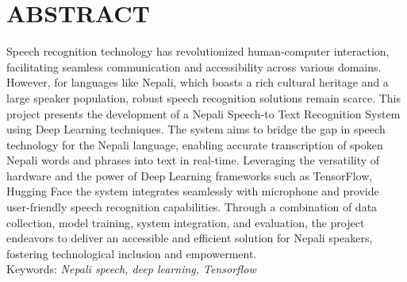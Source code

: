 \cleardoublepage
{}
\chapter*{ABSTRACT}
Speech recognition technology has revolutionized human-computer interaction, facilitating seamless communication and accessibility across various domains. However, for languages like Nepali, which boasts a rich cultural heritage and a large speaker population, robust speech recognition solutions remain scarce. This project presents the development of a Nepali Speech-to
Text Recognition System using Deep Learning techniques. The system aims to bridge the gap in speech technology for the Nepali language, enabling accurate transcription of spoken Nepali words and phrases into text in real-time. Leveraging the versatility of hardware and the power of Deep Learning frameworks such as TensorFlow, Hugging Face the system integrates seamlessly with microphone and provide user-friendly speech recognition capabilities. Through a combination of data collection, model training, system integration, and evaluation, the project endeavors to deliver an accessible and efficient solution for Nepali speakers, fostering technological inclusion and empowerment. \\
\newline
Keywords: \textit{Nepali speech, deep learning, Tensorflow}
